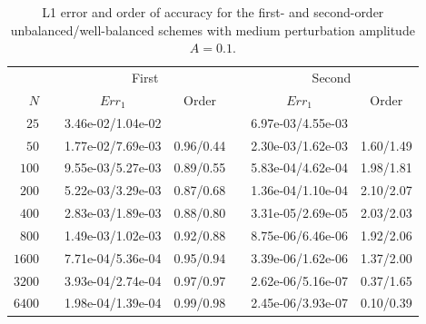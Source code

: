 \begin{table}\centering
\caption{L1 error and order of accuracy for the first- and second-order unbalanced/well-balanced schemes with medium perturbation amplitude $A=0.1$.}
\label{table:OVS_Amedium}
\begin{tabular}{@{}rcccccc@{}}\toprule
& \phantom{a} & \multicolumn{2}{c}{First} & \phantom{ab} & \multicolumn{2}{c}{Second}\\
\cmidrule{3-4} \cmidrule{6-7}
$N$ && $Err_1$ & Order && $Err_1$ & Order\\ \midrule
$25$ && 3.46e-02/1.04e-02 &&& 6.97e-03/4.55e-03 &\\
$50$ && 1.77e-02/7.69e-03 & 0.96/0.44 && 2.30e-03/1.62e-03 & 1.60/1.49\\
$100$ && 9.55e-03/5.27e-03 & 0.89/0.55 && 5.83e-04/4.62e-04 & 1.98/1.81\\
$200$ && 5.22e-03/3.29e-03 & 0.87/0.68 && 1.36e-04/1.10e-04 & 2.10/2.07\\
$400$ && 2.83e-03/1.89e-03 & 0.88/0.80 && 3.31e-05/2.69e-05 & 2.03/2.03\\
$800$ && 1.49e-03/1.02e-03 & 0.92/0.88 && 8.75e-06/6.46e-06 & 1.92/2.06\\
$1600$ && 7.71e-04/5.36e-04 & 0.95/0.94 && 3.39e-06/1.62e-06 & 1.37/2.00\\
$3200$ && 3.93e-04/2.74e-04 & 0.97/0.97 && 2.62e-06/5.16e-07 & 0.37/1.65\\
$6400$ && 1.98e-04/1.39e-04 & 0.99/0.98 && 2.45e-06/3.93e-07 & 0.10/0.39\\
\bottomrule
\end{tabular}
\end{table}

